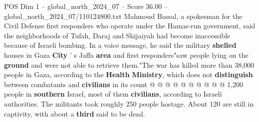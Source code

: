 \begin{textsample}{POS Dim 1 – global\_north\_2024\_07 – Score 36.00 – global\_north\_2024\_07/110124800.txt}
Mahmoud Bassal, a spokesman for the Civil Defense first responders who operate under the Hamas-run government, said the neighborhoods of Tufah, Daraj and Shijaiyah had become inaccessible because of Israeli bombing.
In a voice message, he said the military \textbf{shelled} houses in Gaza \textbf{City} ' s Jaffa \textbf{area} and first responders"saw people lying on the \textbf{ground} and were not able to retrieve them."The war has killed more than 38,000 people in Gaza, according to the \textbf{Health} \textbf{Ministry}, which does not \textbf{distinguish} between combatants and \textbf{civilians} in its count @ @ @ @ @ @ @ @ @ @ 1,200 people in \textbf{southern} Israel, most of them \textbf{civilians}, according to Israeli authorities.
The militants took roughly 250 people hostage.
About 120 are still in captivity, with about a \textbf{third} said to be dead.

\end{textsample}
